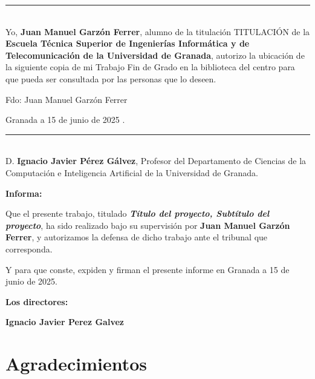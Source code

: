 \newpage


\noindent\rule[-1ex]{\textwidth}{2pt}\\[4.5ex]

Yo, \textbf{Juan Manuel Garzón Ferrer}, alumno de la titulación TITULACIÓN de la \textbf{Escuela Técnica Superior
de Ingenierías Informática y de Telecomunicación de la Universidad de Granada}, autorizo la
ubicación de la siguiente copia de mi Trabajo Fin de Grado en la biblioteca del centro para que pueda ser
consultada por las personas que lo deseen.

\vspace{6cm}

\noindent Fdo: Juan Manuel Garzón Ferrer

\vspace{2cm}

\begin{flushright}
Granada a 15 de junio de 2025 .
\end{flushright}


\newpage

\noindent\rule[-1ex]{\textwidth}{2pt}\\[4.5ex]

D. \textbf{Ignacio Javier Pérez Gálvez}, Profesor del Departamento de Ciencias de la Computación e Inteligencia Artificial de la Universidad de Granada.



\textbf{Informa:}


Que el presente trabajo, titulado \textit{\textbf{Título del proyecto, Subtítulo del proyecto}}, ha sido realizado bajo su supervisión por \textbf{Juan Manuel Garzón Ferrer}, y autorizamos la defensa de dicho trabajo ante el tribunal que corresponda.

\vspace{0.5cm}

Y para que conste, expiden y firman el presente informe en Granada a 15 de junio de 2025.

\vspace{1cm}

\textbf{Los directores:}

\vspace{1cm}

\noindent \textbf{Ignacio Javier Perez Galvez}

\chapter*{Agradecimientos}

\vspace{1cm}

